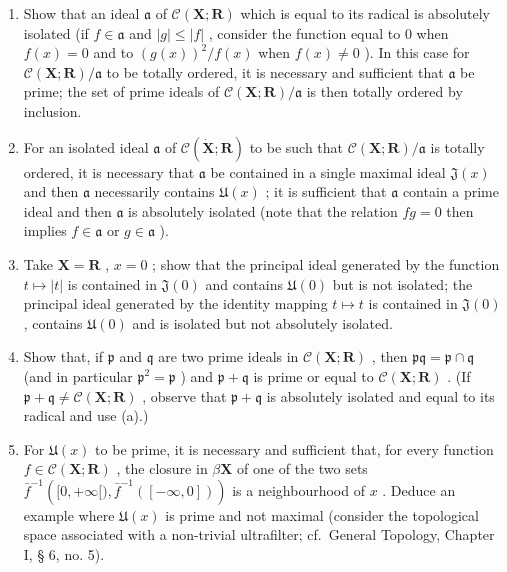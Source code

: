 \begin{enumerate}
\def\labelenumi{(\alph{enumi})}
\item
  Show that an ideal \(\mathfrak{a}\) of \(\mathcal{C}(\mathbf{X};\mathbf{R})\) which is equal to its radical is absolutely isolated (if \(f\in \mathfrak{a}\) and \(|g|\leqslant |f|\) , consider the function equal to 0 when \(f(x) = 0\) and to \((g(x))^2 /f(x)\) when \(f(x)\neq 0\) ). In this case for \(\mathcal{C}(\mathbf{X};\mathbf{R}) / \mathfrak{a}\) to be totally ordered, it is necessary and sufficient that \(\mathfrak{a}\) be prime; the set of prime ideals of \(\mathcal{C}(\mathbf{X};\mathbf{R}) / \mathfrak{a}\) is then totally ordered by inclusion.
\item
  For an isolated ideal \(\mathfrak{a}\) of \(\mathcal{C}(\dot{\mathbf{X}};\mathbf{R})\) to be such that \(\mathcal{C}(\mathbf{X};\mathbf{R}) / \mathfrak{a}\) is totally ordered, it is necessary that \(\mathfrak{a}\) be contained in a single maximal ideal \(\mathfrak{J}(x)\) and then \(\mathfrak{a}\) necessarily contains \(\mathfrak{U}(x)\) ; it is sufficient that \(\mathfrak{a}\) contain a prime ideal and then \(\mathfrak{a}\) is absolutely isolated (note that the relation \(fg = 0\) then implies \(f\in \mathfrak{a}\) or \(g\in \mathfrak{a}\) ).
\item
  Take \(\mathbf{X} = \mathbf{R}\) , \(x = 0\) ; show that the principal ideal generated by the function \(t \mapsto |t|\) is contained in \(\mathfrak{J}(0)\) and contains \(\mathfrak{U}(0)\) but is not isolated; the principal ideal generated by the identity mapping \(t \mapsto t\) is contained in \(\mathfrak{J}(0)\) , contains \(\mathfrak{U}(0)\) and is isolated but not absolutely isolated.
\item
  Show that, if \(\mathfrak{p}\) and \(\mathfrak{q}\) are two prime ideals in \(\mathcal{C}(\mathbf{X};\mathbf{R})\) , then \(\mathfrak{pq} = \mathfrak{p} \cap \mathfrak{q}\) (and in particular \(\mathfrak{p}^2 = \mathfrak{p}\) ) and \(\mathfrak{p} + \mathfrak{q}\) is prime or equal to \(\mathcal{C}(\mathbf{X};\mathbf{R})\) . (If \(\mathfrak{p} + \mathfrak{q} \neq \mathcal{C}(\mathbf{X};\mathbf{R})\) , observe that \(\mathfrak{p} + \mathfrak{q}\) is absolutely isolated and equal to its radical and use (a).)
\item
  For \(\mathfrak{U}(x)\) to be prime, it is necessary and sufficient that, for every function \(f\in\mathcal{C}(\mathbf{X};\mathbf{R})\) , the closure in \(\beta\mathbf{X}\) of one of the two sets \(\bar{f}^{-1}\left([0,+\infty[),\bar{f}^{-1}([- \infty,0])\right)\) is a neighbourhood of \(x\) . Deduce an example where \(\mathfrak{U}(x)\) is prime and not maximal (consider the topological space associated with a non-trivial ultrafilter; cf.~General Topology, Chapter I, § 6, no. 5).

\end{enumerate}
